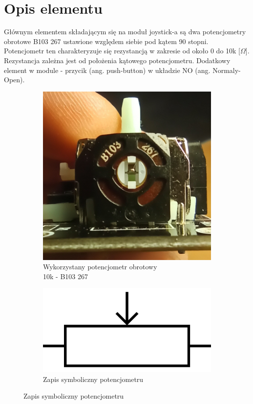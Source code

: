 \documentclass[11pt, a4paper]{article}
\author{Dawid Sobczak}
\begin{document}
%
%
\newpage

\section*{Opis elementu}
Głównym elementem składającym się na moduł joystick-a są dwa potencjometry obrotowe B103 267 ustawione względem siebie pod kątem 90 stopni. Potencjometr ten charakteryzuje się rezystancją w zakresie od około 0 do 10k [$\Omega$]. Rezystancja zależna jest od położenia kątowego potencjometru. Dodatkowy element w module - przycik (ang. push-button) w układzie NO (ang. Normaly-Open).
\vspace{0.25cm}
\begin{figure}[h]
\centering
\begin{subfigure}{.5\textwidth}
\centering
\includegraphics[width=.6\linewidth]{fig/Joystick/b103.jpg}
\caption{\centering Wykorzystany potencjometr obrotowy \\
10k - B103 267}
\label{fig:_zdjecie_elementu}
\end{subfigure}%
\begin{subfigure}{.5\textwidth}
\centering
\includegraphics[width=.6\linewidth]{fig/Joystick/potentiometer_schematic.png}
\caption{Zapis symboliczny potencjometru}
\label{fig:_zasada_dzialania_elementu}
\end{subfigure}
\label{fig:element}
\end{figure}
\vspace{0.25cm}
\end{document}
